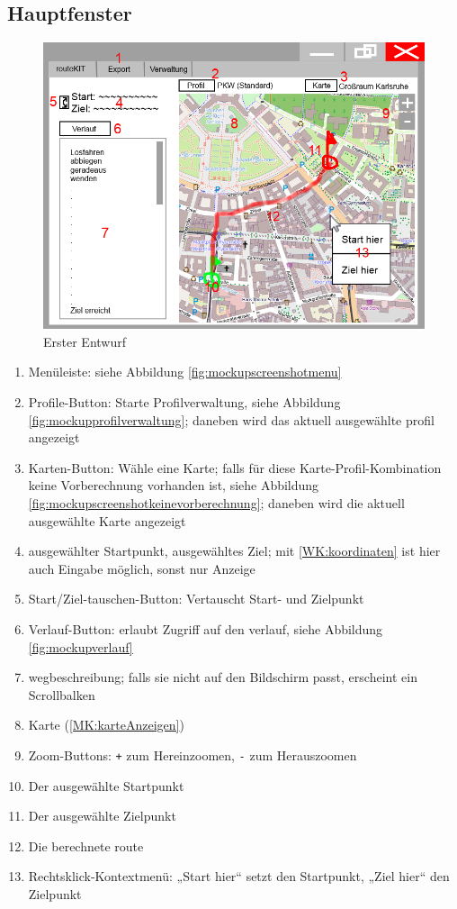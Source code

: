 \documentclass[a4paper, 11pt]{article}
\begin{document}
\subsection{Hauptfenster}
\begin{figure}[H]
\centering
\includegraphics[width=0.7\linewidth]{mockup_screenshot_main}
\caption{Erster Entwurf}
\label{fig:mockupscreenshotmain}
\end{figure}
\begin{enumerate}
\item Menüleiste: siehe Abbildung \ref{fig:mockupscreenshotmenu}
\item Profile-Button: Starte Profilverwaltung, siehe Abbildung \ref{fig:mockupprofilverwaltung}; daneben wird das aktuell ausgewählte \gls{profil} angezeigt
\item Karten-Button: Wähle eine Karte; falls für diese Karte-Profil-Kombination keine Vorberechnung vorhanden ist, siehe Abbildung \ref{fig:mockupscreenshotkeinevorberechnung}; daneben wird die aktuell ausgewählte Karte angezeigt
\item ausgewählter Startpunkt, ausgewähltes Ziel; mit \ref{WK:koordinaten} ist hier auch Eingabe möglich, sonst nur Anzeige
\item Start/Ziel-tauschen-Button: Vertauscht Start- und Zielpunkt
\item Verlauf-Button: erlaubt Zugriff auf den \gls{verlauf}, siehe Abbildung \ref{fig:mockupverlauf}
\item \gls{wegbeschreibung}; falls sie nicht auf den Bildschirm passt, erscheint ein Scrollbalken
\item Karte (\ref{MK:karteAnzeigen})
\item Zoom-Buttons: \texttt{+} zum Hereinzoomen, \texttt{-} zum Herauszoomen
\item Der ausgewählte Startpunkt
\item Der ausgewählte Zielpunkt
\item Die berechnete \gls{route}
\item Rechtsklick-Kontextmenü: „Start hier“ setzt den Startpunkt, „Ziel hier“ den Zielpunkt
\end{enumerate}
\end{document}
